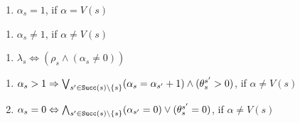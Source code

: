 \documentclass{llncs}
\newcommand{\ttransition}[1]{\ensuremath{\theta_{#1}}}
\newcommand{\transition}[2]{\ensuremath{\ttransition{#1}^{#2}}}
\newcommand{\Succ}{\ensuremath{{\tt{Succ}}}}
\newcommand{\enumerateConstraints}{
	\renewcommand{\labelenumi}{\theenumi}
	\renewcommand{\theenumi}{(\textbf{\arabic{enumi})}}}
\begin{document}
\begin{minipage}{\textwidth}
  \hspace{-0.4cm}
  \begin{minipage}[t]{.3\textwidth}
    \begin{enumerate}
      \enumerateConstraints
      \setcounter{enumi}{10}
      \item {$\alpha_s = 1$,
	 if $\alpha = V(s)$}\label{encoding_erprime_target_state}%
    \end{enumerate}
  \end{minipage}
  \hspace*{0.02\textwidth}
  \begin{minipage}[t]{.3\textwidth}
    \begin{enumerate}
      \enumerateConstraints
      \setcounter{enumi}{11}
      \item { $\alpha_s \neq 1$,
	 if $\alpha \ne V(s)$}\label{encoding_erprime_non_target_state}%
    \end{enumerate}
  \end{minipage}
  \hspace*{0.02\textwidth}
  \begin{minipage}[t]{.34\textwidth}
    \begin{enumerate}
      \enumerateConstraints
      \setcounter{enumi}{12}
      \item { $\lambda_s \Leftrightarrow (\rho_s \wedge (\alpha_s \neq 0))$}\label{encoding_erprime_bool_var}%
    \end{enumerate}
  \end{minipage}  
  \hspace*{-0.4cm}
  \begin{minipage}[t]{0.99\textwidth}
  	\vspace*{-0.2cm}
    \begin{enumerate}
      \enumerateConstraints
      \setcounter{enumi}{13}
      \item { $\alpha_s > 1 \Rightarrow \bigvee_{s^\prime \in \Succ(s) \setminus \{ s \} }(\alpha_s = \alpha_{s^\prime} + 1) \wedge (\transition{s}{s^\prime} > 0)$,
	 if $\alpha \ne V(s)$}\label{encoding_erprime_propag_target}%
      \item { $\alpha_s = 0 \Leftrightarrow \bigwedge_{s^\prime \in \Succ(s) \setminus \{ s \} }(\alpha_{s^\prime} = 0) \vee (\transition{s}{s^\prime} = 0)$,
	 if $\alpha \ne V(s)$}\label{encoding_erprime_propag_non_target}%
    \end{enumerate}
  \end{minipage}  
\end{minipage}
\end{document}
